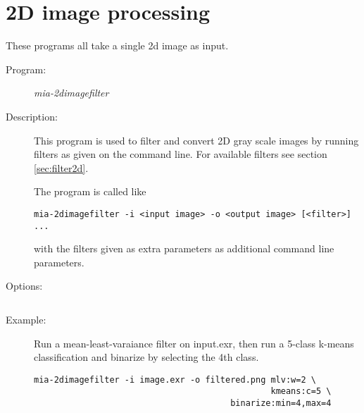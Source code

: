\section{2D image processing}  \label{sec:2dprograms}
  
  These programs all take a single 2d image as input. 

  \label{sec:2dimageproc}  
  
  \begin{description}
  \item [Program:] \emph{mia-2dimagefilter}
  \item [Description:] This program is used to filter and convert 2D gray scale images by running 
  filters as given on the command line. For available filters see section \ref{sec:filter2d}. 

  The program is called like 
  \lstset{language=bash}
  \begin{lstlisting}
mia-2dimagefilter -i <input image> -o <output image> [<filter>] ... 
  \end{lstlisting}
  with the filters given as extra parameters as additional command line parameters. 

  \item [Options:] $\:$

  \tabstart
  \optinfile
  \optoutfile
  \opthelpplugin
  \tabend

  \item [Example:]Run a mean-least-varaiance filter on input.exr, then run a 5-class k-means classification 
           and binarize by selecting the 4th class.
   \lstset{language=bash}
  \begin{lstlisting}
mia-2dimagefilter -i image.exr -o filtered.png mlv:w=2 \
                                               kmeans:c=5 \
		                               binarize:min=4,max=4 
  \end{lstlisting}
  \end{description}
  
